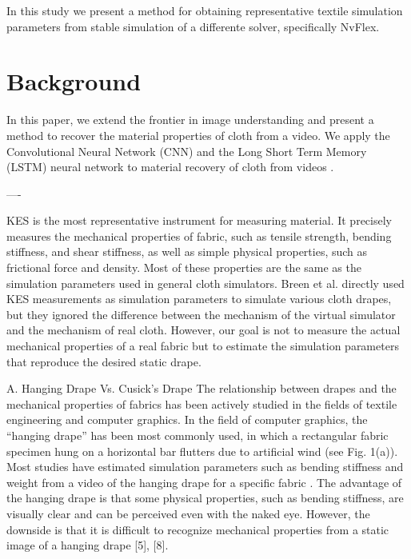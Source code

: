 \documentclass[twocolumn]{article}
\begin{document}
In this study we present a method for obtaining representative textile simulation parameters from stable simulation of a differente solver, specifically NvFlex.

\section{Background}

In this paper, we extend the frontier in image understanding and present a method to recover the material properties of cloth from a video. We apply the Convolutional Neural Network (CNN) and the Long Short Term Memory (LSTM) neural network to material recovery of cloth from videos \cite{Yang2017}.

----

KES \cite{Kawabata2005} is the most representative instrument for measuring material. It precisely measures the mechanical properties of fabric, such as tensile strength, bending stiffness, and shear stiffness, as well as simple physical properties, such as frictional force and density. Most of these properties are the same as the simulation parameters used in general cloth simulators. Breen et al. \cite{Breen1994} directly used KES measurements as simulation parameters to simulate various cloth drapes, but they ignored the difference between the mechanism of the virtual simulator and the mechanism of real cloth. However, our goal is not to measure the actual mechanical properties of a real fabric but to estimate the simulation parameters that reproduce the desired static drape.

A. Hanging Drape Vs. Cusick’s Drape
The relationship between drapes and the mechanical properties of fabrics has been actively studied in the fields of textile engineering and computer graphics. In the field of computer graphics, the “hanging drape” has been most commonly used, in which a rectangular fabric specimen hung on a horizontal bar flutters due to artificial wind (see Fig. 1(a)). Most studies have estimated simulation parameters such as bending stiffness and weight from a video of the hanging drape for a specific fabric \cite{Bouman2013,Bhat2003,Davis2015,Yang2017,Bi}. The advantage of the hanging drape is that some physical properties, such as bending stiffness, are visually clear and can be perceived even with the naked eye. However, the downside is that it is difficult to recognize mechanical properties from a static image of a hanging drape [5], [8].
\end{document}
